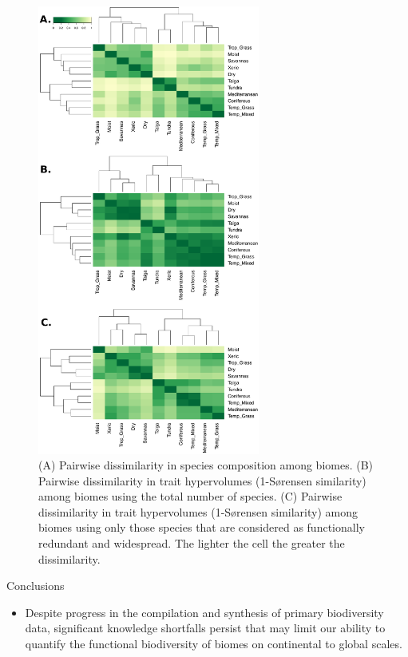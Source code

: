 \documentclass[final]{beamer}
\newlength{\onecolwid}
\begin{document}
\begin{frame}[t]
\begin{columns}[t]
\begin{column}{\onecolwid}
	\begin{figure}[h]
		\centering
		\includegraphics[width=0.65\textwidth]{./figures/heatmaps.pdf}
		\caption{\footnotesize (A) Pairwise dissimilarity in species composition among biomes. (B) Pairwise dissimilarity in trait hypervolumes (1-S\o rensen similarity) among biomes using the total number of species. (C) Pairwise dissimilarity in trait hypervolumes (1-S\o rensen similarity) among biomes using only those species that are considered as functionally redundant and widespread. The lighter the cell the greater the dissimilarity.}
		\label{fig:heatmaps}
	\end{figure}


      		\begin{block}{Conclusions}
      		\begin{itemize}
      		\item Despite progress in the compilation and synthesis of primary biodiversity data, significant knowledge shortfalls persist that may limit our ability to quantify the functional biodiversity of biomes on continental to global scales.
      		

\end{itemize}
\end{block}
\end{column}
\end{columns}
\end{frame}
\end{document}
